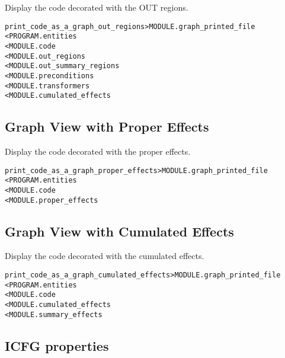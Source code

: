 \documentclass[a4paper]{report}
\newenvironment{PipsMake}{\begin{alltt}}{\end{alltt}}
\begin{document}
Display the code decorated with the OUT regions.

\begin{PipsMake}
print_code_as_a_graph_out_regions              > MODULE.graph_printed_file
        < PROGRAM.entities
        < MODULE.code
        < MODULE.out_regions
        < MODULE.out_summary_regions
        < MODULE.preconditions
        < MODULE.transformers
        < MODULE.cumulated_effects
\end{PipsMake}

\subsection{Graph View with Proper Effects}

Display the code decorated with the proper effects.

\begin{PipsMake}
print_code_as_a_graph_proper_effects       > MODULE.graph_printed_file
        < PROGRAM.entities
        < MODULE.code
        < MODULE.proper_effects
\end{PipsMake}

\subsection{Graph View with Cumulated Effects}

Display the code decorated with the cumulated effects.

\begin{PipsMake}
print_code_as_a_graph_cumulated_effects    > MODULE.graph_printed_file
        < PROGRAM.entities
        < MODULE.code
        < MODULE.cumulated_effects
        < MODULE.summary_effects
\end{PipsMake}

\subsection{ICFG properties}

\label{subsection-interprocedural-control-flow-graph}
\end{document}
